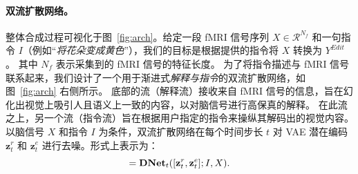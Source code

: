 \paragraph{双流扩散网络。} 整体合成过程可视化于图~\ref{fig:arch}。给定一段 fMRI 信号序列 $X \in \mathcal{R}^{N_f}$ 和一句指令 $I$（例如“\emph{将花朵变成黄色}”），我们的目标是根据提供的指令将 $X$ 转换为 $Y^{Edit}$。
其中 $N_f$ 表示采集到的 fMRI 信号的特征长度。
为了将指令描述与 fMRI 信号联系起来，我们设计了一个用于渐进式\emph{解释与指令}的双流扩散网络，如图~\ref{fig:arch} 右侧所示。
底部的流（解释流）接收来自 fMRI 信号的信息，旨在幻化出视觉上吸引人且语义上一致的内容，以对脑信号进行高保真的解释。
在此流之上，另一个流（指令流）旨在根据用户指定的指令来操纵其解码出的视觉内容。以脑信号 $X$ 和指令 $I$ 为条件，双流扩散网络在每个时间步长 $t$ 对 VAE 潜在编码 $\textbf{z}_t^r$ 和 $\textbf{z}_t^e$ 进行去噪。形式上表示为：
\begin{equation}
    [\textbf{z}_{(t-1)}^r, \textbf{z}_{(t-1)}^e] = \textbf{\text{DNet}}_{t}([\textbf{z}_t^r, \textbf{z}_t^e]; I, X).
\end{equation}

